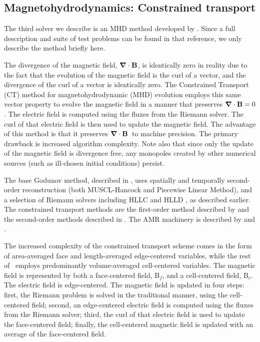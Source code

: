 \subsection{Magnetohydrodynamics: Constrained transport}
\label{sec.num.mhd-ct}
\def\Bvec{{\bf B}}
\def\Bf{Bf}
\def\Bc{Bc}
\def\Evec{{\bf E}}
\def\Divb{\ensuremath{\div \Bvec}}

The third solver we describe is an MHD method developed by 
\citet{Collins10}.  Since a full description and suite of test problems can be
found in that reference, we only describe the method briefly here.

The divergence of the magnetic field, \Divb, is
identically zero in reality due to the fact that the evolution of the magnetic field is the
curl of a vector, and the divergence of the curl of a vector is identically
zero.
The Constrained Transport (CT) method \citep{Evans88, Balsara99} for
magnetohydrodynamic (MHD) evolution employs this same vector property
to evolve the magnetic field in a manner that preserves $\Divb=0$.  
The electric field is computed using
the fluxes from the Riemann solver.  The curl of that electric field
is then used to update the magnetic field.  The advantage of this
method is that it preserves \Divb\ to machine precision.  The primary
drawback is increased algorithm complexity.  Note also that since 
only the update of the magnetic field is divergence free, any monopoles 
created by other numerical sources (such as ill-chosen initial conditions) persist.

The base Godunov method, described in \citet{Li08a}, uses spatially and
temporally second-order reconstruction (both MUSCL-Hancock and
Piecewise Linear Method), and a selection of Riemann solvers including
HLLC and HLLD \citep{Mignone07}, as described earlier.  
The constrained transport methods
are the first-order method described by \citet{Balsara99} and the
second-order methods described in \citet{Gardiner05}.  The AMR
machinery is described by \citet{Balsara01} and \citet{Collins10}.

The increased complexity of the constrained transport scheme comes in
the form of area-averaged face and length-averaged edge-centered
variables, while the rest of \enzo\ employs predominantly
volume-averaged cell-centered variables.  The magnetic field is
represented by both a face-centered field, B$_f$, and a cell-centered
field, B$_c$.  The electric field is edge-centered.  The magnetic
field is updated in four steps: first, the Riemann problem is solved
in the traditional manner, using the cell-centered field; second, an
edge-centered electric field is computed using the fluxes from the
Riemann solver; third, the curl of that electric field is used to
update the face-centered field; finally, the cell-centered magnetic
field is updated with an average of the face-centered field.

